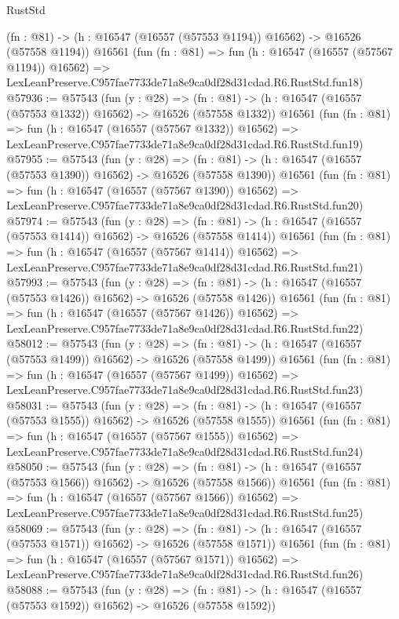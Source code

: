 \begin{lexlean}{RustStd}
\begin{coremodule}
    (fn : @81) -> (h : @16547 (@16557 (@57553 @1194)) @16562) -> @16526 (@57558 @1194))
    @16561
    (fun (fn : @81) =>
    fun (h : @16547 (@16557 (@57567 @1194)) @16562) =>
    LexLeanPreserve.C957fae7733de71a8e9ca0df28d31cdad.R6.RustStd.fun18)
@57936 := @57543
    (fun (y : @28) =>
    (fn : @81) -> (h : @16547 (@16557 (@57553 @1332)) @16562) -> @16526 (@57558 @1332))
    @16561
    (fun (fn : @81) =>
    fun (h : @16547 (@16557 (@57567 @1332)) @16562) =>
    LexLeanPreserve.C957fae7733de71a8e9ca0df28d31cdad.R6.RustStd.fun19)
@57955 := @57543
    (fun (y : @28) =>
    (fn : @81) -> (h : @16547 (@16557 (@57553 @1390)) @16562) -> @16526 (@57558 @1390))
    @16561
    (fun (fn : @81) =>
    fun (h : @16547 (@16557 (@57567 @1390)) @16562) =>
    LexLeanPreserve.C957fae7733de71a8e9ca0df28d31cdad.R6.RustStd.fun20)
@57974 := @57543
    (fun (y : @28) =>
    (fn : @81) -> (h : @16547 (@16557 (@57553 @1414)) @16562) -> @16526 (@57558 @1414))
    @16561
    (fun (fn : @81) =>
    fun (h : @16547 (@16557 (@57567 @1414)) @16562) =>
    LexLeanPreserve.C957fae7733de71a8e9ca0df28d31cdad.R6.RustStd.fun21)
@57993 := @57543
    (fun (y : @28) =>
    (fn : @81) -> (h : @16547 (@16557 (@57553 @1426)) @16562) -> @16526 (@57558 @1426))
    @16561
    (fun (fn : @81) =>
    fun (h : @16547 (@16557 (@57567 @1426)) @16562) =>
    LexLeanPreserve.C957fae7733de71a8e9ca0df28d31cdad.R6.RustStd.fun22)
@58012 := @57543
    (fun (y : @28) =>
    (fn : @81) -> (h : @16547 (@16557 (@57553 @1499)) @16562) -> @16526 (@57558 @1499))
    @16561
    (fun (fn : @81) =>
    fun (h : @16547 (@16557 (@57567 @1499)) @16562) =>
    LexLeanPreserve.C957fae7733de71a8e9ca0df28d31cdad.R6.RustStd.fun23)
@58031 := @57543
    (fun (y : @28) =>
    (fn : @81) -> (h : @16547 (@16557 (@57553 @1555)) @16562) -> @16526 (@57558 @1555))
    @16561
    (fun (fn : @81) =>
    fun (h : @16547 (@16557 (@57567 @1555)) @16562) =>
    LexLeanPreserve.C957fae7733de71a8e9ca0df28d31cdad.R6.RustStd.fun24)
@58050 := @57543
    (fun (y : @28) =>
    (fn : @81) -> (h : @16547 (@16557 (@57553 @1566)) @16562) -> @16526 (@57558 @1566))
    @16561
    (fun (fn : @81) =>
    fun (h : @16547 (@16557 (@57567 @1566)) @16562) =>
    LexLeanPreserve.C957fae7733de71a8e9ca0df28d31cdad.R6.RustStd.fun25)
@58069 := @57543
    (fun (y : @28) =>
    (fn : @81) -> (h : @16547 (@16557 (@57553 @1571)) @16562) -> @16526 (@57558 @1571))
    @16561
    (fun (fn : @81) =>
    fun (h : @16547 (@16557 (@57567 @1571)) @16562) =>
    LexLeanPreserve.C957fae7733de71a8e9ca0df28d31cdad.R6.RustStd.fun26)
@58088 := @57543
    (fun (y : @28) =>
    (fn : @81) -> (h : @16547 (@16557 (@57553 @1592)) @16562) -> @16526 (@57558 @1592))

\end{coremodule}
\end{lexlean}

